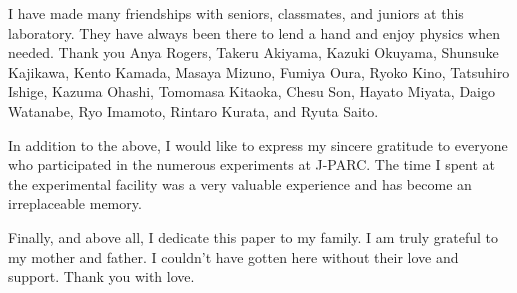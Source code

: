 I have made many friendships with seniors, classmates, and juniors at this laboratory. They have always been there to lend a hand and enjoy physics when needed. Thank you Anya Rogers, Takeru Akiyama, Kazuki Okuyama, Shunsuke Kajikawa, Kento Kamada, Masaya Mizuno, Fumiya Oura, Ryoko Kino, Tatsuhiro Ishige, Kazuma Ohashi, Tomomasa Kitaoka, Chesu Son, Hayato Miyata, Daigo Watanabe, Ryo Imamoto, Rintaro Kurata, and Ryuta Saito.

In addition to the above, I would like to express my sincere gratitude to everyone who participated in the numerous experiments at J-PARC. The time I spent at the experimental facility was a very valuable experience and has become an irreplaceable memory.

Finally, and above all, I dedicate this paper to my family. I am truly grateful to my mother and father. I couldn't have gotten here without their love and support. Thank you with love.

%
